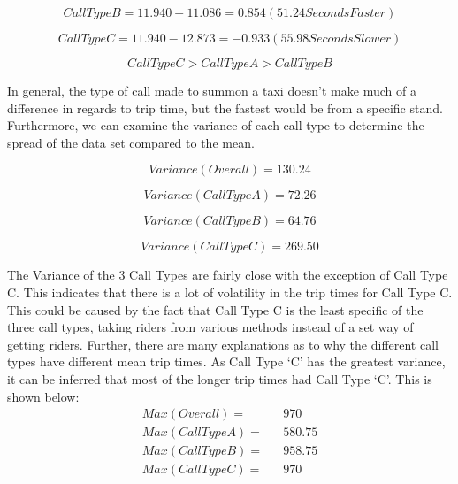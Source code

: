 \documentclass[11pt]{article}
\begin{document}
\begin{equation}
Call Type B = 11.940 - 11.086 = 0.854(51.24 Seconds Faster)
\end{equation}

\begin{equation}
Call Type C = 11.940 - 12.873 = -0.933 (55.98 Seconds Slower)
\end{equation}

\begin{equation}
Call Type C > Call Type A > Call Type B
\end{equation}

\par
In general, the type of call made to summon a taxi doesn’t make much of a difference in regards to trip time, but the fastest would be from a 
specific stand. Furthermore, we can examine the variance of each call type to determine the spread of the data set compared to the mean.

\begin{equation}
Variance (Overall) = 130.24
\end{equation}

\begin{equation}
Variance (Call Type A) = 72.26
\end{equation}

\begin{equation}
Variance (Call Type B) = 64.76
\end{equation}

\begin{equation}
Variance (Call Type C) = 269.50
\end{equation}

\par
The Variance of the 3 Call Types are fairly close with the exception of Call Type C. This indicates that there is a lot of volatility in the trip times for Call Type C. 
This could be caused by the fact that Call Type C is the least specific of the three call types, taking riders from various methods instead of a set way of getting riders. 
Further, there are many explanations as to why the different call types have different mean trip times. As Call Type ‘C’ has the greatest variance, it can be inferred that 
most of the longer trip times had Call Type ‘C’. This is shown below:
\begin{equation*}
	\begin{aligned}
		Max(Overall) =&& 970\\
Max(Call Type A) =&& 580.75\\
Max(Call Type B) =&& 958.75\\
Max(Call Type C) =&& 970
	\end{aligned}
\end{equation*}
\end{document}
